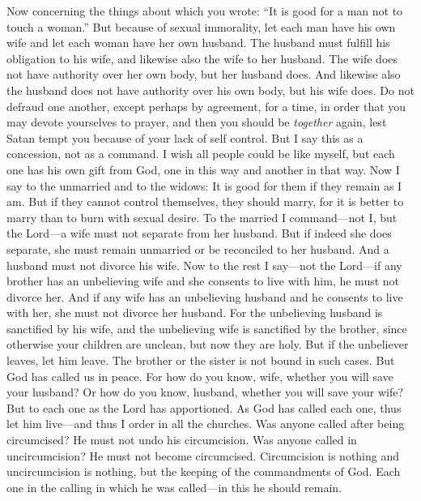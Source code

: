 \begin{biblechapter} %
 Now concerning the things about which you wrote: “It is good for a man not to touch a woman.”
\verse But because of sexual immorality, let each man have his own wife and let each woman have her own husband.
\verse The husband must fulfill his obligation to his wife, and likewise also the wife to her husband.
\verse The wife does not have authority over her own body, but her husband does. And likewise also the husband does not have authority over his own body, but his wife does.
\verse Do not defraud one another, except perhaps by agreement, for a time, in order that you may devote yourselves to prayer, and then you should be \textit{together} again, lest Satan tempt you because of your lack of self control.
\verse But I say this as a concession, not as a command.
\verse I wish all people could be like myself, but each one has his own gift from God, one in this way and another in that way.
\verse Now I say to the unmarried and to the widows: It is good for them if they remain as I am.
\verse But if they cannot control themselves, they should marry, for it is better to marry than to burn with sexual desire.
\verse To the married I command—not I, but the Lord—a wife must not separate from her husband.
\verse But if indeed she does separate, she must remain unmarried or be reconciled to her husband. And a husband must not divorce his wife.
\verse Now to the rest I say—not the Lord—if any brother has an unbelieving wife and she consents to live with him, he must not divorce her.
\verse And if any wife has an unbelieving husband and he consents to live with her, she must not divorce her husband.
\verse For the unbelieving husband is sanctified by his wife, and the unbelieving wife is sanctified by the brother, since otherwise your children are unclean, but now they are holy.
\verse But if the unbeliever leaves, let him leave. The brother or the sister is not bound in such cases. But God has called us in peace.
\verse For how do you know, wife, whether you will save your husband? Or how do you know, husband, whether you will save your wife?
\verse But to each one as the Lord has apportioned. As God has called each one, thus let him live—and thus I order in all the churches.
\verse Was anyone called after being circumcised? He must not undo his circumcision. Was anyone called in uncircumcision? He must not become circumcised.
\verse Circumcision is nothing and uncircumcision is nothing, but the keeping of the commandments of God.
\verse Each one in the calling in which he was called—in this he should remain.

\end{biblechapter}
